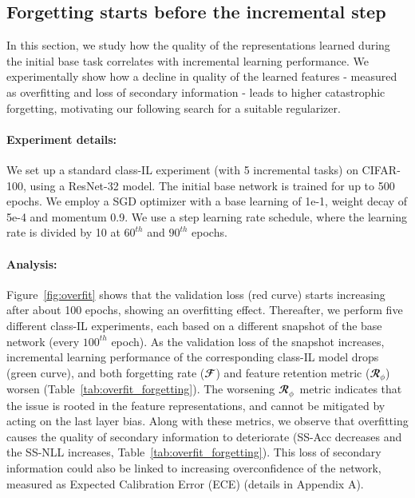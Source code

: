 \documentclass[final]{cvpr}
\newcommand{\cfr}{$\mathbfcal{R}_{\phi}$} \newcommand\todo[1]{(\textcolor{red}{TODO: #1})}
\begin{document}
\subsection{Forgetting starts before the incremental step}
\label{sec:overfitting}


In this section, we study how the quality of the representations learned during the initial base task correlates with incremental learning performance. 
We experimentally show how a decline in quality of the learned features - measured as overfitting and loss of secondary information - leads to higher catastrophic forgetting, motivating our following search for a suitable regularizer.

\paragraph{Experiment details:} We set up a standard class-IL experiment (with 5 incremental tasks) on CIFAR-100, using a ResNet-32 model.
The initial base network is trained for up to 500 epochs. We employ a SGD optimizer with a base learning of 1e-1, weight decay of 5e-4 and momentum 0.9. We use a step learning rate schedule, where the learning rate is divided by 10 at $60^{th}$ and $90^{th}$ epochs.

\paragraph{Analysis:} Figure~\ref{fig:overfit} shows that the validation loss (red curve) starts increasing after about 100 epochs, showing an overfitting effect.
Thereafter, we perform five different class-IL experiments, each based on a different snapshot of the base network (every $100^{th}$ epoch).
As the validation loss of the snapshot increases, incremental learning performance of the corresponding class-IL model drops (green curve), and both forgetting rate ($\mathbfcal{F}$) and feature retention metric (\cfr) worsen (Table~\ref{tab:overfit_forgetting}). The worsening \cfr~metric indicates that the issue is rooted in the feature representations, and cannot be mitigated by acting on the last layer bias.
Along with these metrics, we observe that overfitting causes the quality of secondary information to deteriorate (SS-Acc decreases and the SS-NLL increases, Table~\ref{tab:overfit_forgetting}).
This loss of secondary information could also be linked to increasing overconfidence of the network, measured as Expected Calibration Error (ECE) \cite{pmlr-v70-guo17a} (details in Appendix A).
\end{document}

